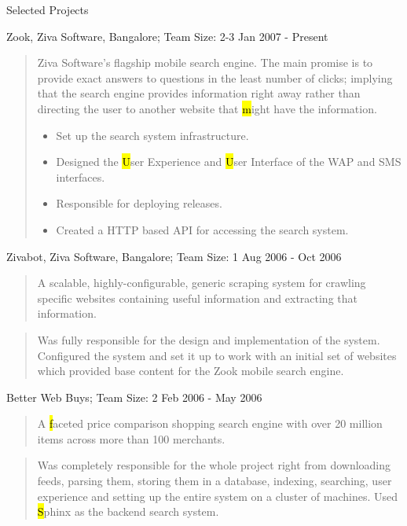 \documentclass{resume}
\newcommand{\teamsize}{\sc\footnotesize Team Size: }
\begin{document}
\begin{category}{Selected Projects}{}
    \item {\topic Zook,} Ziva Software, Bangalore;
        {\teamsize 2-3}
        {\period Jan 2007 - Present}
        \begin{quotation}
            Ziva Software's flagship mobile search engine.  The main promise is to
            provide exact answers to questions in the least number of clicks;
            implying that the search engine provides information right away rather
            than directing the user to another website that {\hl might} have the
            information.

            \begin{itemize}
                \item Set up the search system infrastructure.
                \item Designed the {\hl User Experience} and {\hl User Interface}
                    of the WAP and SMS interfaces.
                \item Responsible for deploying releases.
                \item Created a HTTP based API for accessing the search system.
            \end{itemize}
        \end{quotation}

    \pagebreak

    \item {\topic Zivabot,} Ziva Software, Bangalore;
        {\teamsize 1}
        {\period Aug 2006 - Oct 2006}
        \begin{quotation}
            A scalable, highly-configurable, generic scraping system for crawling
            specific websites containing useful information and extracting that
            information.
        \end{quotation}
        \begin{quotation}
            Was fully responsible for the design and implementation of the system.
            Configured the system and set it up to work with an initial set of
            websites which provided base content for the Zook mobile search engine.
        \end{quotation}

    \item {\topic Better Web Buys;}
        {\teamsize 2}
        {\period Feb 2006 - May 2006}
        \begin{quotation}
            A {\hl faceted price comparison shopping search engine} with over 20
            million items across more than 100 merchants.
        \end{quotation}
        \begin{quotation}
            Was completely responsible for the whole project right from downloading
            feeds, parsing them, storing them in a database, indexing, searching,
            user experience and setting up the entire system on a cluster of
            machines. Used {\hl Sphinx} as the backend search system.
        \end{quotation}


\end{category}
\end{document}
